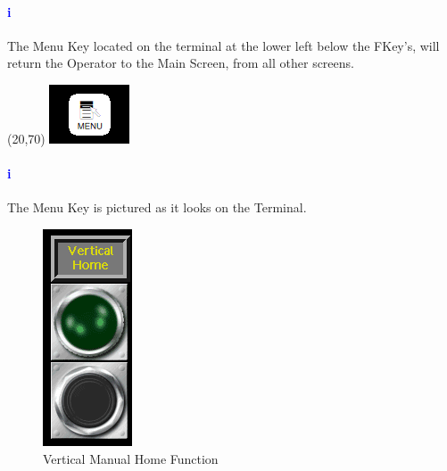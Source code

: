 \paragraph*{\textbf{\LARGE \textcolor{blue}{i}}}
The Menu Key located on the terminal at the lower left below the FKey's, will return the Operator to the Main Screen, from all other screens.\\
\begin{minipage}{4cm}
	\begin{picture}(20,70)
	\includegraphics[width=.5\linewidth]{screen-captures/menu}
	\end{picture}
\end{minipage}\begin{minipage}[]{11cm}
	\paragraph{\textbf{\LARGE \textcolor{blue}{i}}} The Menu Key is pictured as it looks on the Terminal.
\end{minipage}
\pagebreak
\nopagebreak
\begin{figure}
	\centering
	\includegraphics[width=.2\linewidth]{screen-captures/vert-manual-home}
	\caption{Vertical Manual Home Function}
	\label{fig:vert-manual-home}
\end{figure}
